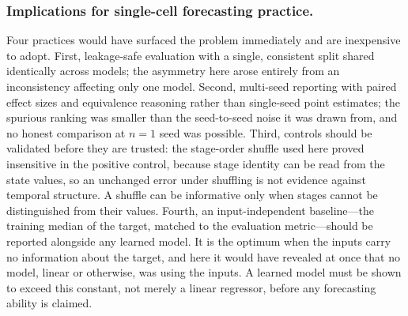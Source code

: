 \documentclass[pdflatex,sn-mathphys-num]{sn-jnl}
\theoremstyle{thmstyleone}%
\theoremstyle{thmstyletwo}%
\theoremstyle{thmstylethree}%
\begin{document}
\subsubsection{Implications for single-cell forecasting practice.} Four practices would have surfaced the problem immediately and are inexpensive to adopt. First, leakage-safe evaluation with a single, consistent split shared identically across models; the asymmetry here arose entirely from an inconsistency affecting only one model. Second, multi-seed reporting with paired effect sizes and equivalence reasoning rather than single-seed point estimates; the spurious ranking was smaller than the seed-to-seed noise it was drawn from, and no honest comparison at $n=1$ seed was possible. Third, controls should be validated before they are trusted: the stage-order shuffle used here proved insensitive in the positive control, because stage identity can be read from the state values, so an unchanged error under shuffling is not evidence against temporal structure. A shuffle can be informative only when stages cannot be distinguished from their values. Fourth, an input-independent baseline---the training median of the target, matched to the evaluation metric---should be reported alongside any learned model. It is the optimum when the inputs carry no information about the target, and here it would have revealed at once that no model, linear or otherwise, was using the inputs. A learned model must be shown to exceed this constant, not merely a linear regressor, before any forecasting ability is claimed.
\end{document}
